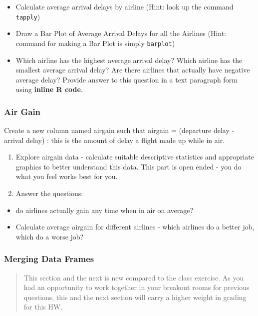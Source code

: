 \documentclass[
]{article}
\begin{document}
\begin{itemize}
\item
  Calculate average arrival delays by airline (Hint: look up the command
  \texttt{tapply})
\item
  Draw a Bar Plot of Average Arrival Delays for all the Airlines (Hint:
  command for making a Bar Plot is simply \texttt{barplot})
\item
  Which airline has the highest average arrival delay? Which airline has
  the smallest average arrival delay? Are there airlines that actually
  have negative average delay? Provide answer to this question in a text
  paragraph form using \textbf{inline R code}.
\end{itemize}

\hypertarget{air-gain}{%
\subsubsection{Air Gain}\label{air-gain}}

Create a new column named airgain such that airgain = (departure delay -
arrival delay) : this is the amount of delay a flight made up while in
air.

\begin{enumerate}
\def\labelenumi{\alph{enumi})}
\item
  Explore airgain data - calculate suitable descriptive statistics and
  appropriate graphics to better understand this data. This part is open
  ended - you do what you feel works best for you.
\item
  Answer the questions:
\end{enumerate}

\begin{itemize}
\item
  do airlines actually gain any time when in air on average?
\item
  Calculate average airgain for different airlines - which airlines do a
  better job, which do a worse job?
\end{itemize}

\hypertarget{merging-data-frames}{%
\subsubsection{Merging Data Frames}\label{merging-data-frames}}

\begin{quote}
This section and the next is new compared to the class exercise. As you
had an opportunity to work together in your breakout rooms for previous
questions, this and the next section will carry a higher weight in
grading for this HW.
\end{quote}
\end{document}
